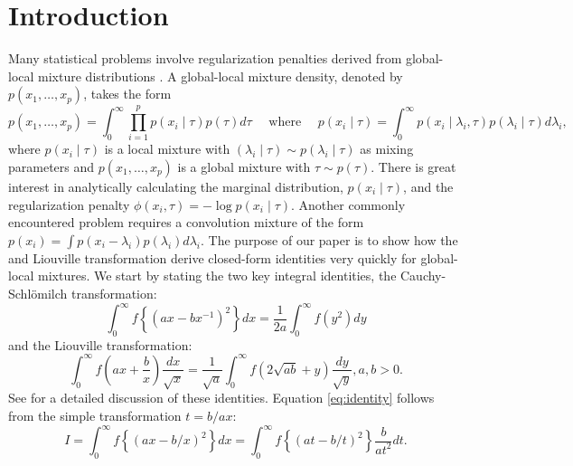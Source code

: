 \documentclass[lineno]{biometrika}
\begin{document}
\section{Introduction}
Many statistical problems involve regularization penalties derived from global-local mixture distributions \citep{polson2011data, hans2011comment,bhadra2015horseshoe+}. A global-local mixture density, denoted by $p(x_1, \ldots, x_p)$, takes the form 
\begin{equation*}
p(x_1, \ldots, x_p) = \int_{0}^{\infty}\prod_{i=1}^{p}  p(x_i \mid \tau) p(\tau) d\tau \quad \text{ where } \quad
p( x_i \mid \tau) = \int_{0}^{\infty} p(x_i \mid \lambda_i, \tau) p(\lambda_i \mid \tau) d\lambda_i, 
\end{equation*}
where $p(x_i \mid \tau)$ is a local mixture with $(\lambda_i \mid \tau) \sim p(\lambda_i \mid \tau )$ as mixing parameters and $p(x_1, \ldots, x_p)$ is a global mixture with $\tau \sim p(\tau)$. There is great interest in analytically calculating the marginal distribution, $p(x_i \mid \tau)$, and the regularization penalty $\phi(x_i, \tau) = -\log p(x_i \mid \tau)$. Another commonly encountered problem requires a convolution mixture of the form $p(x_i) = \int p(x_i - \lambda_i) p(\lambda_i) d \lambda_i$. 
The purpose of our paper is to show how the \CS and Liouville transformation derive closed-form identities very quickly for global-local mixtures. 
We start by stating the two key integral identities, the Cauchy-Schl\"omilch transformation: 
\begin{equation}
\int_0^\infty f \left\{ ( a x - b x^{-1} )^2 \right\} d x = \frac{1}{2a} \int_0^\infty f(y^2) d y \label{eq:identity}
\end{equation}
and the Liouville transformation:
\begin{equation}
\int_{0}^{\infty} f\left(ax + \frac{b}{x} \right) \frac{dx}{\sqrt{x}} = \frac{1}{\sqrt{a}} \int_{0}^{\infty} f \left( 2\sqrt{ab} + y \right) \frac{dy}{\sqrt{y}}, a,b >0. \label{eq:liouville}
\end{equation}
See \cite{boros2006irresistible,baker2008probabilistic,amdeberhan2010cauchy,jones2014generating} for a detailed discussion of these identities. 
Equation \eqref{eq:identity} follows from the simple transformation $t = b/ax$: 
\begin{equation*}
  I = \int_{0}^{\infty} f \left\{(ax - b/x)^2 \right\} dx = \int_{0}^{\infty} f \left\{(at - b/t)^2 \right\} \frac{b}{at^2} dt.
\end{equation*}
\end{document}

